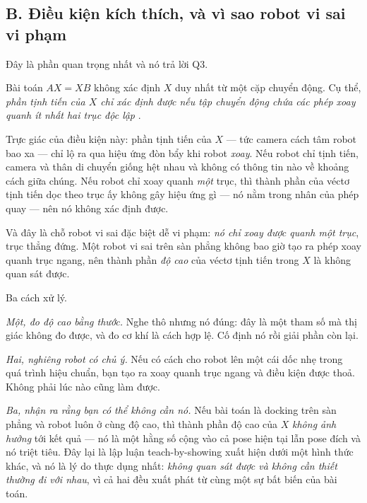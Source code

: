 \documentclass[../../marker.tex]{subfiles}
\begin{document}
\subsection{B. Điều kiện kích thích, và vì sao robot vi sai vi phạm}

Đây là phần quan trọng nhất và nó trả lời Q3.

Bài toán \(AX = XB\) không xác định \(X\) duy nhất từ một cặp chuyển động. Cụ thể, \emph{phần tịnh tiến của \(X\) chỉ xác định được nếu tập chuyển động chứa các phép xoay quanh ít nhất hai trục độc lập} \cite[§IV]{tsai1989handeye}.

Trực giác của điều kiện này: phần tịnh tiến của \(X\) --- tức camera cách tâm robot bao xa --- chỉ lộ ra qua hiệu ứng đòn bẩy khi robot \emph{xoay}. Nếu robot chỉ tịnh tiến, camera và thân di chuyển giống hệt nhau và không có thông tin nào về khoảng cách giữa chúng. Nếu robot chỉ xoay quanh \emph{một} trục, thì thành phần của véctơ tịnh tiến dọc theo trục ấy không gây hiệu ứng gì --- nó nằm trong nhân của phép quay --- nên nó không xác định được.

Và đây là chỗ robot vi sai đặc biệt dễ vi phạm: \emph{nó chỉ xoay được quanh một trục}, trục thẳng đứng. Một robot vi sai trên sàn phẳng không bao giờ tạo ra phép xoay quanh trục ngang, nên thành phần \emph{độ cao} của véctơ tịnh tiến trong \(X\) là không quan sát được.

Ba cách xử lý.

\emph{Một, đo độ cao bằng thước.} Nghe thô nhưng nó đúng: đây là một tham số mà thị giác không đo được, và đo cơ khí là cách hợp lệ. Cố định nó rồi giải phần còn lại.

\emph{Hai, nghiêng robot có chủ ý.} Nếu có cách cho robot lên một cái dốc nhẹ trong quá trình hiệu chuẩn, bạn tạo ra xoay quanh trục ngang và điều kiện được thoả. Không phải lúc nào cũng làm được.

\emph{Ba, nhận ra rằng bạn có thể không cần nó.} Nếu bài toán là docking trên sàn phẳng và robot luôn ở cùng độ cao, thì thành phần độ cao của \(X\) \emph{không ảnh hưởng} tới kết quả --- nó là một hằng số cộng vào cả pose hiện tại lẫn pose đích và nó triệt tiêu. Đây lại là lập luận teach-by-showing xuất hiện dưới một hình thức khác, và nó là lý do thực dụng nhất: \emph{không quan sát được và không cần thiết thường đi với nhau}, vì cả hai đều xuất phát từ cùng một sự bất biến của bài toán.
\end{document}
